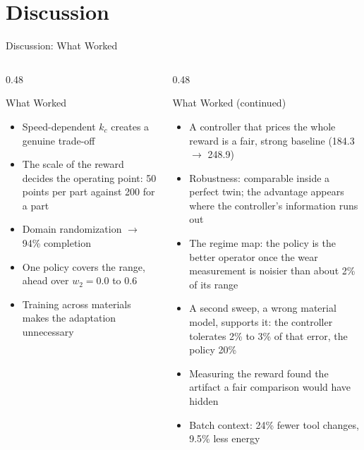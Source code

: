\documentclass[11pt,aspectratio=169]{beamer}
\begin{document}
\section{Discussion}

\begin{frame}{Discussion: What Worked}
    \small
    \begin{columns}[T]
        \begin{column}{0.48\textwidth}
            \begin{block}{What Worked}
            \footnotesize
            \begin{itemize}
                \item Speed-dependent $k_c$ creates a genuine trade-off
                \item The \alert{scale of the reward} decides the operating point: 50 points per part against 200 for a part
                \item Domain randomization $\to$ 94\% completion
                \item One policy covers the range, ahead over $w_2 = 0.0$ to 0.6
                \item Training across materials makes the adaptation unnecessary
            \end{itemize}
            \end{block}
        \end{column}
        \begin{column}{0.48\textwidth}
            \begin{block}{What Worked (continued)}
            \footnotesize
            \begin{itemize}
            \setlength{\itemsep}{-1pt}
            \setlength{\topsep}{-2pt}
            \setlength{\parsep}{0pt}
                \item A controller that prices the whole reward is a fair, strong baseline (184.3 $\to$ 248.9)
                \item Robustness: comparable inside a perfect twin; the advantage appears where the controller's information runs out
                \item The regime map: the policy is the better operator once the wear measurement is noisier than \alert{about 2\% of its range}
                \item A second sweep, a wrong material model, supports it: the controller tolerates 2\% to 3\% of that error, the policy 20\%
                \item Measuring the reward found the artifact a fair comparison would have hidden
                \item Batch context: 24\% fewer tool changes, 9.5\% less energy
            \end{itemize}
            \end{block}
        \end{column}
    \end{columns}
\end{frame}
\end{document}
